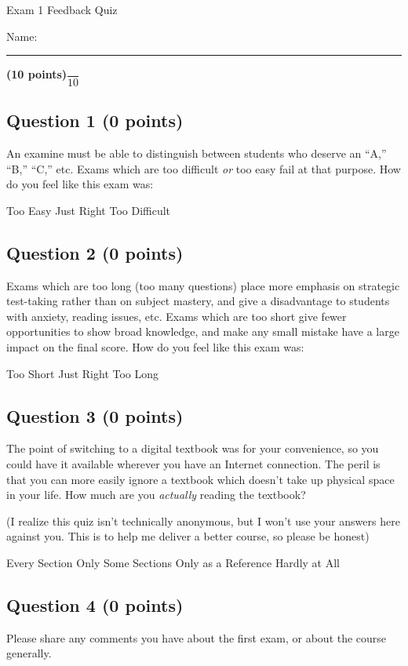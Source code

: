 \documentclass[12pt, letterpaper]{memoir}
\begin{document}
	\begin{center}
		{\large	Exam 1 Feedback Quiz}
	\end{center}
	{\large Name: \rule[-1mm]{4in}{.1pt} {\bfseries (10 points)}\hspace{4em}$\dfrac{~}{10}$} 
	\subsection*{Question 1 (0 points)}
	An examine must be able to distinguish between students who deserve an ``A,'' ``B,'' ``C,'' etc. Exams which are too difficult \emph{or} too easy fail at that purpose. How do you feel like this exam was:
	
	{\large Too Easy} \hspace{2em} {\large Just Right} \hspace{2em} {\large Too Difficult}

	\vspace{2em}
	\subsection*{Question 2 (0 points)}
	Exams which are too long (too many questions) place more emphasis on strategic test-taking rather than on subject mastery, and give a disadvantage to students with anxiety, reading issues, etc. Exams which are too short give fewer opportunities to show broad knowledge, and make any small mistake have a large impact on the final score.  How do you feel like this exam was:
	
	{\large Too Short} \hspace{2em} {\large Just Right} \hspace{2em} {\large Too Long}
	
	\vspace{2em}
	\subsection*{Question 3 (0 points)}
	The point of switching to a digital textbook was for your convenience, so you could have it available wherever you have an Internet connection. The peril is that you can more easily ignore a textbook which doesn't take up physical space in your life. How much are you \emph{actually} reading the textbook?
	
	\noindent(I realize this quiz isn't technically anonymous, but I won't use your answers here against you. This is to help me deliver a better course, so please be honest)
	
	{\large Every Section} \hspace{2em} {\large Only Some Sections} \hspace{2em} {\large Only as a Reference} \hspace{2em} {\large Hardly at All}
	
	\vspace{2em}
	\subsection*{Question 4 (0 points)}
	Please share any comments you have about the first exam, or about the course generally.
\end{document}
